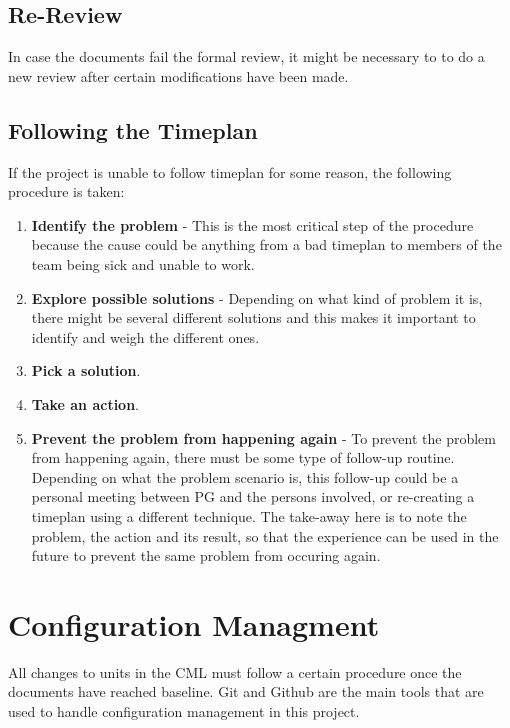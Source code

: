 \documentclass{article}
\begin{document}
    \subsection{Re-Review}
        In case the documents fail the formal review, it might be necessary to
        to do a new review after certain modifications have been made.
            
    \subsection{Following the Timeplan}
        If the project is unable to follow timeplan for some reason, the following procedure is taken:
        \begin{enumerate}
            \item \textbf{Identify the problem} - This is the most critical step of the            procedure because the cause could be anything from a bad timeplan to
                    members of the team being sick and unable to work.
            \item \textbf{Explore possible solutions} - Depending on what kind of problem it is, there might be several different solutions and this makes it important to identify and weigh the different ones.
            \item \textbf{Pick a solution}. 
            \item \textbf{Take an action}. 
            \item \textbf{Prevent the problem from happening again} - 
                    To prevent the problem from happening again, there must be some
                    type of follow-up routine. Depending on what the problem scenario is,
                    this follow-up could be a personal meeting between PG and the persons
                    involved, or re-creating a timeplan using a different technique.
                    The take-away here is to note the problem, the action and its
                    result, so that the experience can be used in the future to prevent
                    the same problem from occuring again.
        \end{enumerate}

\section{Configuration Managment}   %
    All changes to units in the CML must follow a certain procedure once the documents
    have reached baseline. Git and Github are the main tools that are used to handle configuration management in this project.
\end{document}
